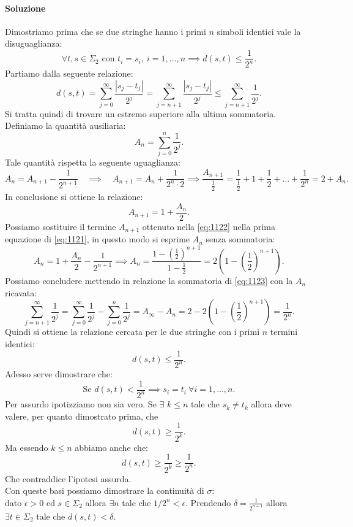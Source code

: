 \paragraph{Soluzione}%
Dimostriamo prima che se due stringhe hanno i primi $n$ simboli identici vale la disuguaglianza:
\[
    \forall t, s \in \Sigma_2 \text{ con } t_i = s_i, \ i = 1, \ldots, n \implies  d(s, t) \le \frac{1}{2^n}
.\] 
Partiamo dalla seguente relazione:
\[
    d(s, t) = \sum_{j=0}^{\infty} \frac{\left|s_j - t_j\right|}{2^j}=\sum_{j=n+1}^{\infty} \frac{\left|s_j - t_j\right|}{2^j}
    \le \sum_{j=n+1}^{\infty} \frac{1}{2^j}
    \label{eq:1123}
.\] 
Si tratta quindi di trovare un estremo superiore alla ultima sommatoria. Definiamo la quantità ausiliaria:
\[
    A_{n}=\sum_{j=0}^{n} \frac{1}{2^j}
.\] 
Tale quantità rispetta la seguente uguaglianza:
\[
    A_n = A_{n+1}-\frac{1}{2^{n+1}} \quad \implies  \quad  A_{n+1} = A_n + \frac{1}{2^n\cdot 2} \implies  \frac{A_{n+1}}{\frac{1}{2}}= \frac{1}{\frac{1}{2}}+ 1 + \frac{1}{2}+\ldots+ \frac{1}{2^n} = 2 + A_{n}
    \label{eq:1121}
.\] 
In conclusione si ottiene la relazione:
\[
    A_{n+1}=1 + \frac{A_n}{2}
    \label{eq:1122}
.\] 
Possiamo sostituire il termine $A_{n+1}$ ottenuto nella \ref{eq:1122} nella prima equazione di \ref{eq:1121}, in questo modo si esprime $A_n$ senza sommatoria:
\[
    A_n = 1 + \frac{A_n}{2}-\frac{1}{2^{n+1}} \implies  A_n = \frac{1-\left(\frac{1}{2}\right)^{n+1}}{1- \frac{1}{2}}=
    2\left(1-\left(\frac{1}{2}\right)^{n+1}\right)
.\] 
Possiamo concludere mettendo in relazione la sommatoria di \ref{eq:1123} con la $A_n$ ricavata:
\[
    \sum_{j=n+1}^{\infty} \frac{1}{2^j} = \sum_{j=0}^{\infty} \frac{1}{2^j} - \sum_{j=0}^{n} \frac{1}{2^j} = A_{\infty}-A_n=
    2-2\left(1-\left(\frac{1}{2}\right)^{n+1}\right) = \frac{1}{2^n}
.\] 
Quindi si ottiene la relazione cercata per le due stringhe con i primi $n$ termini identici:
\[
    d(s,t) \le \frac{1}{2^n}
.\] 
Adesso serve dimostrare che:
\[
    \text{Se }  d(s, t) < \frac{1}{2^n} \implies  s_i = t_i \ \forall i = 1, \ldots, n
.\] 
Per assurdo ipotizziamo non sia vero. Se $\exists$ $k\le n$ tale che $s_k \neq t_k$ allora deve valere, per quanto dimostrato prima, che
\[
    d(s, t) \ge \frac{1}{2^k}
.\] 
Ma essendo $k\le n$ abbiamo anche che:
\[
    d(s, t) \ge \frac{1}{2^k} \ge \frac{1}{2^n}
.\] 
Che contraddice l'ipotesi assurda.\\
Con queste basi possiamo dimostrare la continuità di $\sigma$:\\
dato $\epsilon >0$ ed $s \in \Sigma_2$ allora $\exists n$ tale che $1 /2^n<\epsilon$. Prendendo $\delta  = \frac{1}{2^{n+1}}$ allora $\exists t\in \Sigma_2$ tale che $d(s,t) <\delta$. \\
